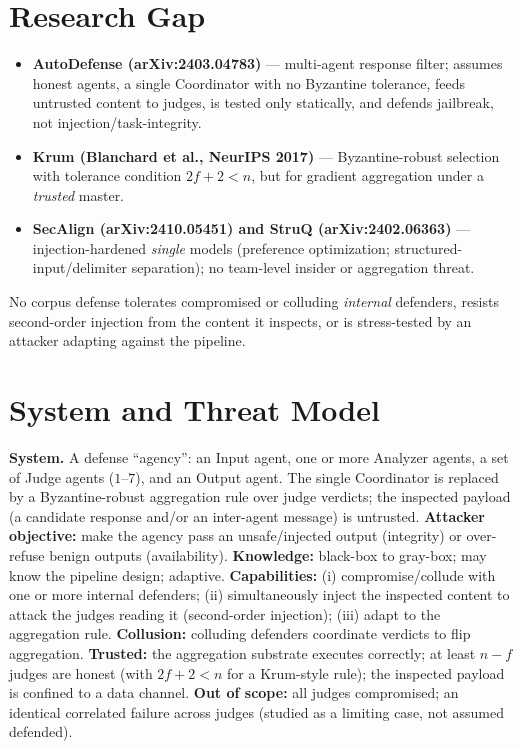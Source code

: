 \documentclass[11pt]{article}
\begin{document}
\section*{Research Gap}
\begin{itemize}
  \item \textbf{AutoDefense (arXiv:2403.04783)} --- multi-agent response filter; assumes honest agents, a single Coordinator with no Byzantine tolerance, feeds untrusted content to judges, is tested only statically, and defends jailbreak, not injection/task-integrity.
  \item \textbf{Krum (Blanchard et al., NeurIPS 2017)} --- Byzantine-robust selection with tolerance condition $2f+2<n$, but for gradient aggregation under a \emph{trusted} master.
  \item \textbf{SecAlign (arXiv:2410.05451) and StruQ (arXiv:2402.06363)} --- injection-hardened \emph{single} models (preference optimization; structured-input/delimiter separation); no team-level insider or aggregation threat.
\end{itemize}
No corpus defense tolerates compromised or colluding \emph{internal} defenders, resists second-order injection from the content it inspects, or is stress-tested by an attacker adapting against the pipeline.

\section*{System and Threat Model}
\textbf{System.} A defense ``agency'': an Input agent, one or more Analyzer agents, a set of Judge agents ($1$--$7$), and an Output agent. The single Coordinator is replaced by a Byzantine-robust aggregation rule over judge verdicts; the inspected payload (a candidate response and/or an inter-agent message) is untrusted. \textbf{Attacker objective:} make the agency pass an unsafe/injected output (integrity) or over-refuse benign outputs (availability). \textbf{Knowledge:} black-box to gray-box; may know the pipeline design; adaptive. \textbf{Capabilities:} (i) compromise/collude with one or more internal defenders; (ii) simultaneously inject the inspected content to attack the judges reading it (second-order injection); (iii) adapt to the aggregation rule. \textbf{Collusion:} colluding defenders coordinate verdicts to flip aggregation. \textbf{Trusted:} the aggregation substrate executes correctly; at least $n-f$ judges are honest (with $2f+2<n$ for a Krum-style rule); the inspected payload is confined to a data channel. \textbf{Out of scope:} all judges compromised; an identical correlated failure across judges (studied as a limiting case, not assumed defended).
\end{document}
